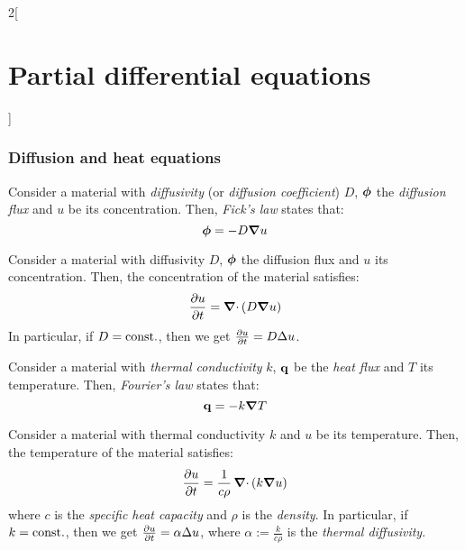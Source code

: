 \documentclass[../../../main.tex]{subfiles}
\begin{document}
\begin{multicols}{2}[\section{Partial differential equations}]
  \subsubsection{Diffusion and heat equations}
  \begin{proposition}
    Consider a material with \emph{diffusivity} (or \emph{diffusion coefficient}) $D$, $\boldsymbol{\mathrm{\phi}}$ the \emph{diffusion flux} and $u$ be its concentration. Then, \emph{Fick's law} states that: $$\boldsymbol{\mathrm{\phi}}=-D\grad{u}$$
  \end{proposition}
  \begin{proposition}
    Consider a material with diffusivity $D$, $\boldsymbol{\mathrm{\phi}}$ the diffusion flux and $u$ its concentration. Then, the concentration of the material satisfies: $$\pdv{u}{t}=\operatorname{\boldsymbol{\mathrm{\nabla}}\cdot}\left(D\grad{u}\right)$$
    In particular, if $D=\text{const.}$, then we get $\pdv{u}{t}=D\Delta{u}$.
  \end{proposition}
  \begin{proposition}
    Consider a material with \emph{thermal conductivity} $k$, $\boldsymbol{\mathrm{q}}$ be the \emph{heat flux} and $T$ its temperature. Then, \emph{Fourier's law} states that: $$\boldsymbol{\mathrm{q}}=-k\grad{T}$$
  \end{proposition}
  \begin{proposition}
    Consider a material with thermal conductivity $k$ and $u$ be its temperature. Then, the temperature of the material satisfies: $$\pdv{u}{t}=\frac{1}{c\rho}\operatorname{\boldsymbol{\mathrm{\nabla}}\cdot}\left(k\grad{u}\right)$$
    where $c$ is the \emph{specific heat capacity} and $\rho$ is the \emph{density}. In particular, if $k=\text{const.}$, then we get $\pdv{u}{t}=\alpha\Delta{u}$, where $\alpha:=\frac{k}{c\rho}$ is the \emph{thermal diffusivity}.
  \end{proposition}

\end{multicols}
\end{document}
